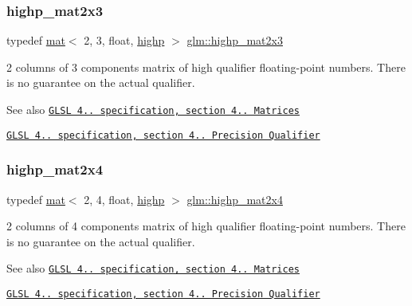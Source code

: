 \subsubsection{\texorpdfstring{highp\+\_\+mat2x3}{highp\_mat2x3}}
{\footnotesize\ttfamily typedef \hyperlink{structglm_1_1mat}{mat}$<$ 2, 3, float, \hyperlink{namespaceglm_a36ed105b07c7746804d7fdc7cc90ff25ac6f7eab42eacbb10d59a58e95e362074}{highp} $>$ \hyperlink{group__core__precision_ga9d61903aea75d6932829cd049f2e622a}{glm\+::highp\+\_\+mat2x3}}

2 columns of 3 components matrix of high qualifier floating-\/point numbers. There is no guarantee on the actual qualifier.

\begin{DoxySeeAlso}{See also}
\href{http://www.opengl.org/registry/doc/GLSLangSpec.4.20.8.pdf}{\tt G\+L\+SL 4.. specification, section 4.. Matrices} 

\href{http://www.opengl.org/registry/doc/GLSLangSpec.4.20.8.pdf}{\tt G\+L\+SL 4.. specification, section 4.. Precision Qualifier} 
\end{DoxySeeAlso}
\mbox{\label{group__core__precision_ga4ad5980b248b3d4dcf014db8fa4495cf}} 
\subsubsection{\texorpdfstring{highp\+\_\+mat2x4}{highp\_mat2x4}}
{\footnotesize\ttfamily typedef \hyperlink{structglm_1_1mat}{mat}$<$ 2, 4, float, \hyperlink{namespaceglm_a36ed105b07c7746804d7fdc7cc90ff25ac6f7eab42eacbb10d59a58e95e362074}{highp} $>$ \hyperlink{group__core__precision_ga4ad5980b248b3d4dcf014db8fa4495cf}{glm\+::highp\+\_\+mat2x4}}

2 columns of 4 components matrix of high qualifier floating-\/point numbers. There is no guarantee on the actual qualifier.

\begin{DoxySeeAlso}{See also}
\href{http://www.opengl.org/registry/doc/GLSLangSpec.4.20.8.pdf}{\tt G\+L\+SL 4.. specification, section 4.. Matrices} 

\href{http://www.opengl.org/registry/doc/GLSLangSpec.4.20.8.pdf}{\tt G\+L\+SL 4.. specification, section 4.. Precision Qualifier} 
\end{DoxySeeAlso}
\mbox{\label{group__core__precision_gaa1178bd043ab93d1207bda8d06cd078c}} 
